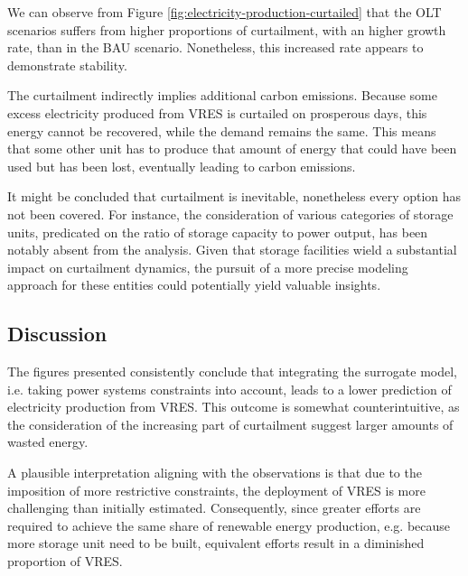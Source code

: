 We can observe from Figure \ref{fig:electricity-production-curtailed} that the OLT scenarios suffers from higher proportions of curtailment, with an higher growth rate, than in the BAU scenario. Nonetheless, this increased rate appears to demonstrate stability.

The curtailment indirectly implies additional carbon emissions. Because some excess electricity produced from VRES is curtailed on prosperous days, this energy cannot be recovered, while the demand remains the same. This means that some other unit has to produce that amount of energy that could have been used but has been lost, eventually leading to carbon emissions.

It might be concluded that curtailment is inevitable, nonetheless every option has not been covered. For instance, the consideration of various categories of storage units, predicated on the ratio of storage capacity to power output, has been notably absent from the analysis. Given that storage facilities wield a substantial impact on curtailment dynamics, the pursuit of a more precise modeling approach for these entities could potentially yield valuable insights.

\subsection{Discussion}

The figures presented consistently conclude that integrating the surrogate model, i.e. taking power systems constraints into account, leads to a lower prediction of electricity production from VRES. This outcome is somewhat counterintuitive, as the consideration of the increasing part of curtailment suggest larger amounts of wasted energy.

A plausible interpretation aligning with the observations is that due to the imposition of more restrictive constraints, the deployment of VRES is more challenging than initially estimated. Consequently, since greater efforts are required to achieve the same share of renewable energy production, e.g. because more storage unit need to be built, equivalent efforts result in a diminished proportion of VRES.


